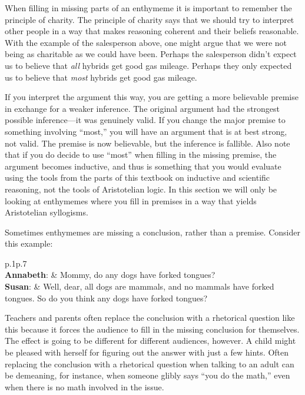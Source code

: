 When filling in missing parts of an enthymeme it is important to remember the principle of charity. The principle of charity says that we should try to interpret other people in a way that makes reasoning coherent and their beliefs reasonable. With the example of the salesperson above, one might argue that we were not being as charitable as we could have been. Perhaps the salesperson didn't expect us to believe that \textit{all} hybrids get good gas mileage. Perhaps they only expected us to believe that \textit{most} hybrids get good gas mileage.

If you interpret the argument this way, you are getting a more believable premise in exchange for a weaker inference. The original argument had the strongest possible inference---it was genuinely valid. If you change the major premise to something involving ``most,'' you will have an argument that is at best strong, not  valid. The premise is now believable, but the inference is fallible. Also note that if you do decide to use ``most'' when filling in the missing premise, the argument becomes inductive, and thus is something that you would evaluate using the tools from the parts of this textbook on inductive and scientific reasoning, not the tools of Aristotelian logic. In this section we will only be looking at enthymemes where you fill in premises in a way that yields Aristotelian syllogisms.

Sometimes enthymemes are missing a conclusion, rather than a premise. Consider this example:

\begin{tabu}{p{.1\linewidth}p{.7\linewidth}}
\\
\textbf{Annabeth}: & Mommy, do any dogs have forked tongues? \\
\textbf{Susan}:  & Well, dear, all dogs are mammals, and no mammals have forked tongues. So do you think any dogs have forked tongues?\\
\end{tabu}

Teachers and parents often replace the conclusion with a rhetorical question like this because it forces the audience to fill in the missing conclusion for themselves. The effect is going to be different for different audiences, however. A child might be pleased with herself for figuring out the answer with just a few hints. Often replacing the conclusion with a rhetorical question when talking to an adult can be demeaning, for instance, when someone glibly says ``you do the math,'' even when there is no math involved in the issue.

